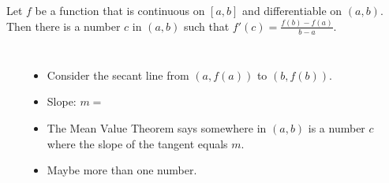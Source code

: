 \begin{frame}[t]
\begin{theorem}
Let $f$ be a function that is continuous on $[a,b]$ and differentiable on $(a,b)$. 
Then there is a number $c$ in $(a,b)$ such that $f'(c) = \frac{f(b)-f(a)}{b-a}$.
\end{theorem}
\begin{columns}[c]
\ %
%
%
\begin{itemize}
\item<2->  Consider the secant line from $(a, f(a))$ to $(b, f(b))$.
\item<2-| alert@3-4>  Slope: $m = $ 
\item<5->  The Mean Value Theorem says somewhere in $(a,b)$ is a number $c$ where the slope of the tangent equals $m$.
\item<handout:2| 6->  Maybe more than one number.
\end{itemize}
\end{columns}
\end{frame}
